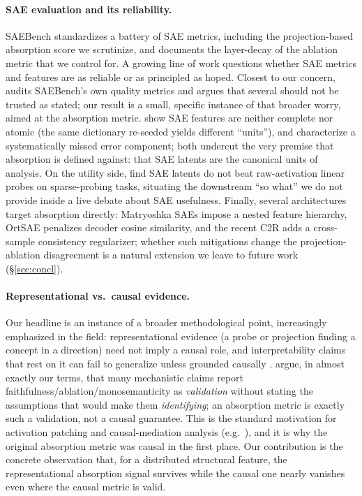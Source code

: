 \documentclass[11pt]{article}
\theoremstyle{definition}
\begin{document}
\paragraph{SAE evaluation and its reliability.}
SAEBench \citep{karvonen2025saebench} standardizes a battery of SAE metrics, including the projection-based
absorption score we scrutinize, and documents the layer-decay of the ablation metric that we control for.
A growing line of work questions whether SAE metrics and features are as reliable or as principled as hoped.
Closest to our concern, \citet{chanin2026benchmarks} audits SAEBench's own quality metrics and argues that
several should not be trusted as stated; our result is a small, specific instance of that broader worry,
aimed at the absorption metric. \citet{leask2025canonical} show SAE features are neither complete nor atomic
(the same dictionary re-seeded yields different ``units''), and \citet{engels2024darkmatter} characterize a
systematically missed error component; both undercut the very premise that absorption is defined against:
that SAE latents are the canonical units of analysis. On the utility side, \citet{kantamneni2025saeprobing} find
SAE latents do not beat raw-activation linear probes on sparse-probing tasks, situating the downstream
``so what'' we do not provide inside a live debate about SAE usefulness. Finally, several architectures
target absorption directly: Matryoshka SAEs \citep{bussmann2025matryoshka} impose a nested feature
hierarchy, OrtSAE \citep{korznikov2025ortsae} penalizes decoder cosine similarity, and the recent
C2R \citep{jin2026c2r} adds a cross-sample consistency regularizer; whether such mitigations change the
projection-ablation disagreement is a natural extension we leave to future work (\S\ref{sec:concl}).

\paragraph{Representational vs.\ causal evidence.}
Our headline is an instance of a broader methodological point, increasingly emphasized in the field:
representational evidence (a probe or projection finding a concept in a direction) need not imply a causal
role, and interpretability claims that rest on it can fail to generalize unless grounded causally
\citep{joshi2026causality}. \citet{lin2026disclose} argue, in almost exactly our terms, that many mechanistic
claims report faithfulness/ablation/monosemanticity as \emph{validation} without stating the assumptions
that would make them \emph{identifying}; an absorption metric is exactly such a validation, not a causal
guarantee. This is the standard motivation for activation patching and causal-mediation analysis (e.g.\
\citealp{meng2022rome}), and it is why the original absorption metric was causal in the first place. Our
contribution is the concrete observation that, for a distributed structural feature, the representational
absorption signal survives while the causal one nearly vanishes even where the causal metric is valid.
\end{document}
